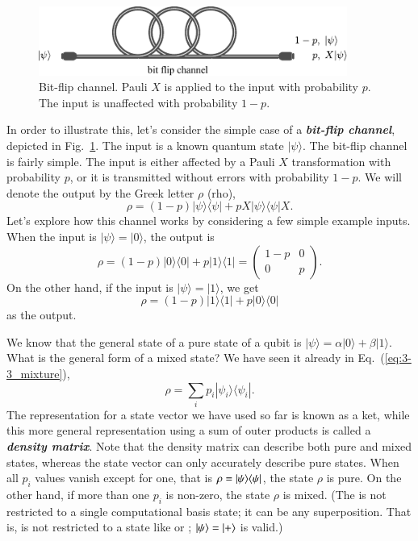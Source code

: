 \begin{figure}[t]
    \centering
    \includegraphics[width=0.9\textwidth]{lesson3/3-3_bit_flip_channel.pdf}
    \caption[Bit-flip channel]{Bit-flip channel. Pauli $X$ is applied to the input with probability $p$. The input is unaffected with probability $1-p$.}
    \label{fig:3-3_bit_flip_channel}
\end{figure}
In order to illustrate this, let's consider the simple case of a \textit{\textbf{bit-flip channel}}, depicted in Fig.~\ref{fig:3-3_bit_flip_channel}.
The input is a known quantum state $|\psi\rangle$.
The bit-flip channel is fairly simple. The input is either affected by a Pauli $X$ transformation with probability $p$, or it is transmitted without errors with probability $1-p$.
We will denote the output by the Greek letter $\rho$ (rho),
\begin{equation}
    \rho = (1-p) |\psi\rangle\langle\psi| + p X|\psi\rangle\langle\psi|X.
    \label{eq:3-3_bit_flip}
\end{equation}
Let's explore how this channel works by considering a few simple example inputs.
When the input is $|\psi\rangle = |0\rangle$, the output is
\begin{equation}
    \rho = (1-p)|0\rangle\langle0| + p|1\rangle\langle1| = \begin{pmatrix} 1-p & 0 \\ 0 & p \end{pmatrix}.
\end{equation}
On the other hand, if the input is $|\psi\rangle=|1\rangle$, we get
\begin{equation}
    \rho = (1-p)|1\rangle\langle1| + p|0\rangle\langle0|
\end{equation}
as the output.

We know that the general state of a pure state of a qubit is $|\psi\rangle = \alpha|0\rangle + \beta|1\rangle$.
What is the general form of a mixed state?
We have seen it already in Eq.~(\ref{eq:3-3_mixture}),
\begin{equation}
    \rho = \sum_i p_i |\psi_i\rangle\langle\psi_i|.
\end{equation}
The representation for a state vector we have used so far is known as a ket, while this more general representation using a sum of outer products is called a \textit{\textbf{density matrix}}.
Note that the density matrix can describe both pure and mixed states, whereas the state vector can only accurately describe pure states.
When all $p_i$ values vanish except for one, that is $\rho=|\psi \rangle \langle \psi|$, the state $\rho$ is pure.
On the other hand, if more than one $p_i$ is non-zero, the state $\rho$ is mixed.  (The \ket{\psi} is not restricted to a single computational basis state; it can be any superposition.  That is, \ket{\psi} is not restricted to a state like  or ; $\left| \psi \right\rangle = \left| + \right\rangle$ is valid.)

